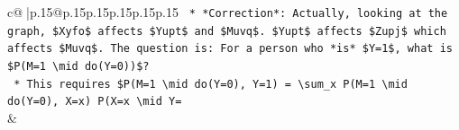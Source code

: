 \documentclass{article}
\begin{document}
{\begin{supertabular}{c@{$\;$}|p{.15\linewidth}@{}p{.15\linewidth}p{.15\linewidth}p{.15\linewidth}p{.15\linewidth}p{.15\linewidth}}
{{{\texttt{    *   *Correction*: Actually, looking at the graph, \$Xyfo\$ affects \$Yupt\$ and \$Muvq\$. \$Yupt\$ affects \$Zupj\$ which affects \$Muvq\$. The question is: For a person who *is* \$Y=1\$, what is \$P(M=1 \textbackslash{}mid do(Y=0))\$?} \\
\texttt{    *   This requires \$P(M=1 \textbackslash{}mid do(Y=0), Y=1) = \textbackslash{}sum\_x P(M=1 \textbackslash{}mid do(Y=0), X=x) P(X=x \textbackslash{}mid Y=} \\
            }
        }
    }
    & \\ \\

\end{supertabular}
}
\end{document}
